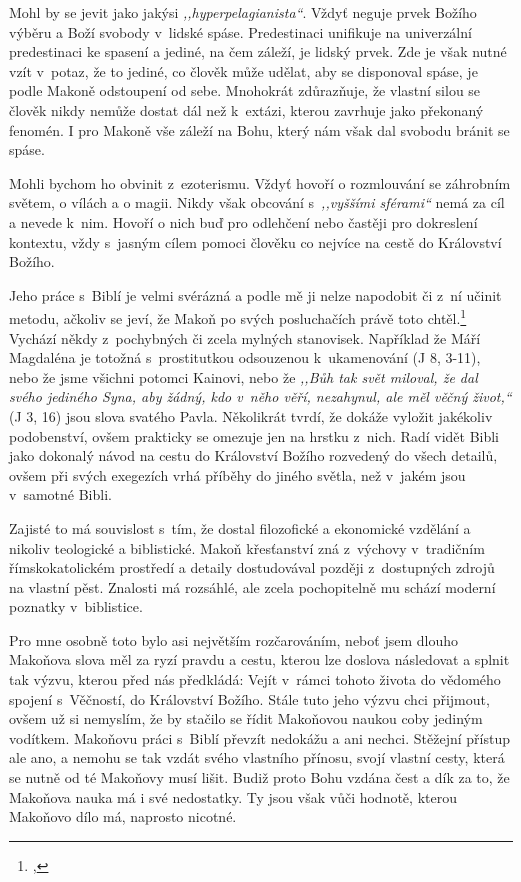 Mohl by se jevit jako jakýsi \textit{,,hyperpelagianista``}. Vždyť neguje prvek
Božího výběru a Boží svobody v~lidské spáse. Predestinaci unifikuje na
univerzální predestinaci ke spasení a jediné, na čem záleží, je lidský prvek.
Zde je však nutné vzít v~potaz, že to jediné, co člověk může udělat, aby se
disponoval spáse, je podle Makoně odstoupení od sebe. Mnohokrát zdůrazňuje, že
vlastní silou se člověk nikdy nemůže dostat dál než k~extázi, kterou zavrhuje
jako překonaný fenomén. I pro Makoně vše záleží na Bohu, který nám však dal
svobodu bránit se spáse.

Mohli bychom ho obvinit z~ezoterismu. Vždyť hovoří o rozmlouvání se záhrobním
světem, o vílách a o
magii. Nikdy však obcování s~\textit{,,vyššími sférami``}
nemá za cíl a nevede k~nim. Hovoří o nich buď pro odlehčení nebo častěji pro
dokreslení kontextu, vždy s~jasným cílem pomoci člověku co nejvíce na cestě do
Království Božího.

Jeho práce s~Biblí je velmi svérázná a podle mě ji nelze napodobit či z~ní
učinit metodu, ačkoliv se jeví, že Makoň po svých posluchačích právě toto
chtěl.\footnote{, }
Vychází někdy z~pochybných či zcela mylných stanovisek. Například že Máří
Magdaléna je totožná s~prostitutkou odsouzenou k~ukamenování (J 8, 3-11), nebo že jsme
všichni potomci Kainovi, nebo že \textit{,,Bůh tak svět miloval, že dal svého jediného
Syna, aby žádný, kdo v~něho věří, nezahynul, ale měl věčný život,``} (J 3, 16) jsou slova
svatého Pavla. Několikrát tvrdí, že dokáže vyložit jakékoliv
podobenství, ovšem
prakticky se omezuje jen na hrstku z~nich. Radí vidět Bibli jako dokonalý návod
na cestu do Království Božího rozvedený do všech detailů, ovšem při svých
exegezích vrhá příběhy do jiného světla, než v~jakém jsou v~samotné
Bibli.

Zajisté to má souvislost s~tím, že dostal filozofické a ekonomické vzdělání a
nikoliv teologické a biblistické. Makoň křesťanství zná z~výchovy v~tradičním
římskokatolickém prostředí a detaily dostudovával později z~dostupných zdrojů na
vlastní pěst. Znalosti má rozsáhlé, ale zcela pochopitelně mu schází moderní
poznatky v~biblistice.

Pro mne osobně toto bylo asi největším rozčarováním, neboť jsem dlouho Makoňova
slova měl za ryzí pravdu a cestu, kterou lze doslova následovat a splnit tak
výzvu, kterou před nás předkládá: Vejít v~rámci tohoto života do vědomého
spojení s~Věčností, do Království Božího. Stále tuto jeho výzvu chci přijmout,
ovšem už si nemyslím, že by stačilo se řídit Makoňovou naukou coby jediným
vodítkem. Makoňovu práci s~Biblí převzít nedokážu a ani nechci. Stěžejní přístup
ale ano, a nemohu se tak vzdát svého vlastního přínosu, svojí vlastní cesty,
která se nutně od té Makoňovy musí lišit. Budiž proto Bohu vzdána čest a dík za
to, že Makoňova nauka má i své nedostatky. Ty jsou však vůči hodnotě, kterou
Makoňovo dílo má, naprosto nicotné.

